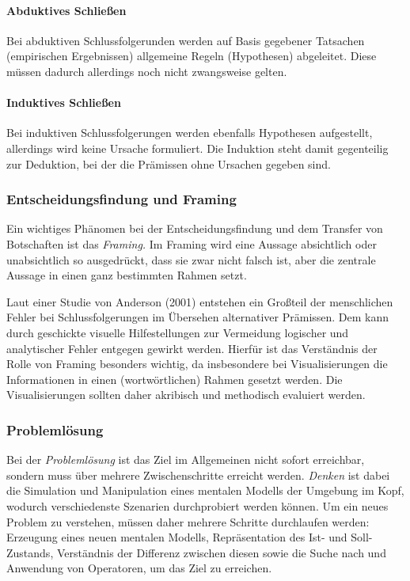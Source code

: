 			\paragraph{Abduktives Schließen}
			Bei abduktiven Schlussfolgerunden werden auf Basis gegebener Tatsachen (empirischen Ergebnissen) allgemeine Regeln (Hypothesen) abgeleitet. Diese müssen dadurch allerdings noch nicht zwangsweise gelten.

			\paragraph{Induktives Schließen}
			Bei induktiven Schlussfolgerungen werden ebenfalls Hypothesen aufgestellt, allerdings wird keine Ursache formuliert. Die Induktion steht damit gegenteilig zur Deduktion, bei der die Prämissen ohne Ursachen gegeben sind.

			\subsubsection{Entscheidungsfindung und Framing}
				Ein wichtiges Phänomen bei der Entscheidungsfindung und dem Transfer von Botschaften ist das \emph{Framing.} Im Framing wird eine Aussage absichtlich oder unabsichtlich so ausgedrückt, dass sie zwar nicht falsch ist, aber die zentrale Aussage in einen ganz bestimmten Rahmen setzt.

				Laut einer Studie von Anderson (2001) entstehen ein Großteil der menschlichen Fehler bei Schlussfolgerungen im Übersehen alternativer Prämissen. Dem kann durch geschickte visuelle Hilfestellungen zur Vermeidung logischer und analytischer Fehler entgegen gewirkt werden. Hierfür ist das Verständnis der Rolle von Framing besonders wichtig, da insbesondere bei Visualisierungen die Informationen in einen (wortwörtlichen) Rahmen gesetzt werden. Die Visualisierungen sollten daher akribisch und methodisch evaluiert werden.

			\subsubsection{Problemlösung}
				Bei der \emph{Problemlösung} ist das Ziel im Allgemeinen nicht sofort erreichbar, sondern muss über mehrere Zwischenschritte erreicht werden. \emph{Denken} ist dabei die Simulation und Manipulation eines mentalen Modells der Umgebung im Kopf, wodurch verschiedenste Szenarien durchprobiert werden können. Um ein neues Problem zu verstehen, müssen daher mehrere Schritte durchlaufen werden: Erzeugung eines neuen mentalen Modells, Repräsentation des Ist- und Soll-Zustands, Verständnis der Differenz zwischen diesen sowie die Suche nach und Anwendung von Operatoren, um das Ziel zu erreichen.

